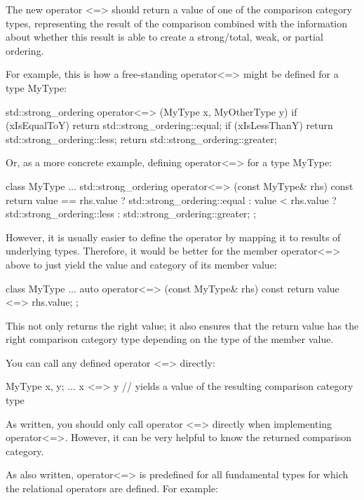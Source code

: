 The new operator <=> should return a value of one of the comparison category types, representing the result of the comparison combined with the information about whether this result is able to create a strong/total, weak, or partial ordering.

For example, this is how a free-standing operator<=> might be defined for a type MyType:

\begin{cpp}
std::strong_ordering operator<=> (MyType x, MyOtherType y)
{
	if (xIsEqualToY) return std::strong_ordering::equal;
	if (xIsLessThanY) return std::strong_ordering::less;
	return std::strong_ordering::greater;
}
\end{cpp}

Or, as a more concrete example, defining operator<=> for a type MyType:

\begin{cpp}
class MyType {
	...
	std::strong_ordering operator<=> (const MyType& rhs) const {
		return value == rhs.value ? std::strong_ordering::equal :
			   value < rhs.value ? std::strong_ordering::less :
							       std::strong_ordering::greater;
	}
};
\end{cpp}

However, it is usually easier to define the operator by mapping it to results of underlying types. Therefore, it would be better for the member operator<=> above to just yield the value and category of its member value:

\begin{cpp}
class MyType {
	...
	auto operator<=> (const MyType& rhs) const {
		return value <=> rhs.value;
	}
};
\end{cpp}

This not only returns the right value; it also ensures that the return value has the right comparison category type depending on the type of the member value.


You can call any defined operator <=> directly:

\begin{cpp}
MyType x, y;
...
x <=> y // yields a value of the resulting comparison category type
\end{cpp}

As written, you should only call operator <=> directly when implementing operator<=>. However, it can be very helpful to know the returned comparison category.

As also written, operator<=> is predefined for all fundamental types for which the relational operators are defined. For example:

